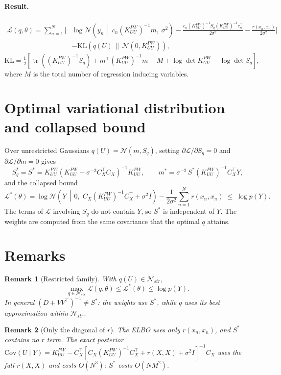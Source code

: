 \documentclass[11pt]{article}
\newcommand{\KUU}{K^{PW}_{UU}}
\newcommand{\iKUU}{(K^{PW}_{UU})^{-1}}
\newcommand{\N}{\mathcal N}
\newcommand{\KL}{\mathrm{KL}}
\newtheorem{remark}{Remark}
\begin{document}
\paragraph{Result.}
\begin{align*}
\mathcal L(q,\theta) = \sum_{n=1}^{N}\Bigg[
&\log\N\!\left(y_n \,\middle|\, c_n\iKUU m,\; \sigma^2\right)
- \frac{c_n\iKUU S_q\iKUU c_n^\top}{2\sigma^2}
- \frac{r(x_n,x_n)}{2\sigma^2}\Bigg] \\
&- \KL\!\left(q(U)\,\|\,\N(0,\KUU)\right),
\end{align*}
\[
\KL = \tfrac12\left[\operatorname{tr}\!\left(\iKUU S_q\right) + m^\top\iKUU m - M
+ \log\det\KUU - \log\det S_q\right],
\]
where $M$ is the total number of regression inducing variables.

\section{Optimal variational distribution and collapsed bound}\label{sec:optimal}

Over unrestricted Gaussians $q(U)=\N(m,S_q)$, setting $\partial\mathcal L/\partial S_q = 0$
and $\partial\mathcal L/\partial m = 0$ gives
\[
S_q^\ast = S^\ast = \KUU\left(\KUU + \sigma^{-2} C_X^\top C_X\right)^{-1}\KUU,
\qquad
m^\ast = \sigma^{-2}\, S^\ast \iKUU C_X^\top Y,
\]
and the collapsed bound
\[
\mathcal L^\ast(\theta) = \log\N\!\left(Y \,\middle|\, 0,\; C_X\iKUU C_X^\top + \sigma^2 I\right)
- \frac{1}{2\sigma^2}\sum_{n=1}^N r(x_n,x_n) \;\le\; \log p(Y).
\]
The terms of $\mathcal L$ involving $S_q$ do not contain $Y$, so $S^\ast$ is independent of
$Y$. The weights are computed from the same covariance that the optimal $q$ attains.

\section{Remarks}

\begin{remark}[Restricted family]
With $q(U)\in\mathcal N_{str}$,
\[
\max_{q\in\mathcal N_{str}} \mathcal L(q,\theta) \le \mathcal L^\ast(\theta) \le \log p(Y).
\]
In general $(D+VV^\top)^{-1} \neq S^\ast$: the weights use $S^\ast$, while $q$ uses its best
approximation within $\mathcal N_{str}$.
\end{remark}

\begin{remark}[Only the diagonal of $r$]
The ELBO uses only $r(x_n,x_n)$, and $S^\ast$ contains no $r$ term. The exact posterior
$\mathrm{Cov}(U\mid Y) = \KUU - C_X^\top\left[C_X\iKUU C_X^\top + r(X,X) + \sigma^2 I\right]^{-1}C_X$
uses the full $r(X,X)$ and costs $O(N^3)$; $S^\ast$ costs $O(NM^2)$.
\end{remark}
\end{document}
